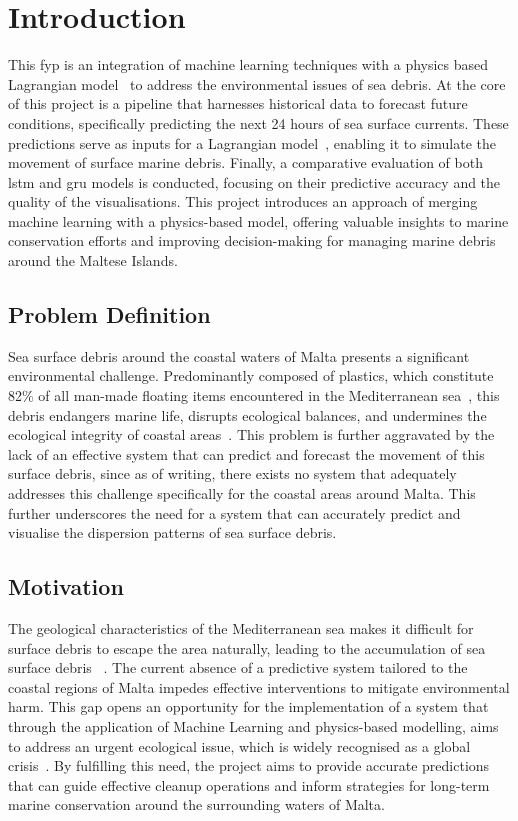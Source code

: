 \chapter{Introduction}
\label{chp:introduction}
This \acrshort{fyp} is an integration of machine learning techniques with a physics based Lagrangian model~\cite{1} to address the environmental issues of sea debris. At the core of this project is a pipeline that harnesses historical data to forecast future conditions, specifically predicting the next 24 hours of sea surface currents. These predictions serve as inputs for a Lagrangian model~\cite{1}, enabling it to simulate the movement of surface marine debris. Finally, a comparative evaluation of both \acrshort{lstm} and \acrshort{gru} models is conducted, focusing on their predictive accuracy and the quality of the visualisations. This project introduces an approach of merging machine learning with a physics-based model, offering valuable insights to marine conservation efforts and improving decision-making for managing marine debris around the Maltese Islands. 

\section{Problem Definition}
\label{sec:problem_definition}
Sea surface debris around the coastal waters of Malta presents a significant environmental challenge. Predominantly composed of plastics, which constitute 82\% of all man-made floating items encountered in the Mediterranean sea~\cite{2}, this debris endangers marine life, disrupts ecological balances, and undermines the ecological integrity of coastal areas~\cite{3}. This problem is further aggravated by the lack of an effective system that can predict and forecast the movement of this surface debris, since as of writing, there exists no system that adequately addresses this challenge specifically for the coastal areas around Malta. This further underscores the need for a system that can accurately predict and visualise the dispersion patterns of sea surface debris.

\section{Motivation}
\label{sec:motivation}
The geological characteristics of the Mediterranean sea makes it difficult for surface debris to  escape the area naturally, leading to the accumulation of sea surface debris ~\cite{4}. The current absence of a predictive system tailored to the coastal regions of Malta impedes effective interventions to mitigate environmental harm. This gap opens an opportunity for the implementation of a system that through the application of Machine Learning and physics-based modelling, aims to address an urgent ecological issue, which is widely recognised as a global crisis~\cite{5}. By fulfilling this need, the project aims to provide accurate predictions that can guide effective cleanup operations and inform strategies for long-term marine conservation around the surrounding waters of Malta. 

